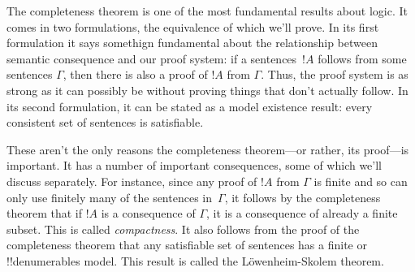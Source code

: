 \documentclass[../../include/open-logic-section]{subfiles}
\begin{document}

The completeness theorem is one of the most fundamental results about
logic.  It comes in two formulations, the equivalence of which we'll
prove. In its first formulation it says somethign fundamental about
the relationship between semantic consequence and our proof system: if
a sentences~$!A$ follows from some sentences $\Gamma$, then there is
also a proof of $!A$ from $\Gamma$.  Thus, the proof system is as
strong as it can possibly be without proving things that don't
actually follow.  In its second formulation, it can be stated as a
model existence result: every consistent set of sentences is
satisfiable.

These aren't the only reasons the completeness theorem---or rather,
its proof---is important. It has a number of important consequences,
some of which we'll discuss separately.  For instance, since any proof
of $!A$ from $\Gamma$ is finite and so can only use finitely many of
the sentences in~$\Gamma$, it follows by the completeness theorem that
if $!A$ is a consequence of $\Gamma$, it is a consequence of already a
finite subset.  This is called \emph{compactness}.  It also follows
from the proof of the completeness theorem that any satisfiable set of
sentences has a finite or !!{denumerable}s model. This result is called the
L\"owenheim-Skolem theorem.
\end{document}

